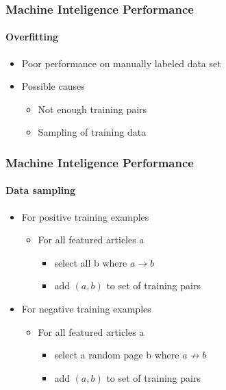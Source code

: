 \begin{frame}
    \frametitle{Machine Inteligence Performance}
    \framesubtitle{Overfitting}
      \begin{itemize}
        \item Poor performance on manually labeled data set
        \item Possible causes 
        \begin{itemize}
          \item Not enough training pairs
          \item Sampling of training data
        \end{itemize}
      \end{itemize}
\end{frame}


\begin{frame}
    \frametitle{Machine Inteligence Performance}
    \framesubtitle{Data sampling}
    \begin{itemize}
      \item For positive training examples
      \begin{itemize}
        \item For all featured articles a
        \begin{itemize}
          \item select all b where $a \rightarrow b$
          \item add $(a,b)$ to set of training pairs
        \end{itemize}
      \end{itemize}
      \item For negative training examples
      \begin{itemize}
        \item For all featured articles a
        \begin{itemize}
          \item select a random page b where $a \not \rightarrow b$
          \item add $(a,b)$ to set of training pairs
        \end{itemize}
      \end{itemize}
    \end{itemize}
\end{frame}

